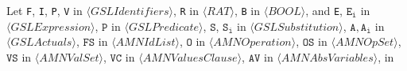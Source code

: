 \documentclass[a4paper,openany]{book}
\begin{document}
\begin{PiDen}
Let \texttt{F}, \texttt{I}, \texttt{P}, \texttt{V} in $\langle\mathit{GSLIdentifiers}\rangle$, \texttt{R} in $\langle\mathit{RAT}\rangle$, \texttt{B} in $\langle\mathit{BOOL}\rangle$, and \texttt{E}, $\mathtt{E_{i}}$ in $\langle\mathit{GSLExpression}\rangle$, $\mathtt{P}$ in $\langle\mathit{GSLPredicate}\rangle$, $\mathtt{S}$, $\mathtt{S_i}$ in $\langle\mathit{GSLSubstitution}\rangle$,  $\mathtt{A}, \mathtt{A_i}$ in $\langle\mathit{GSLActuals}\rangle$, $\mathtt{FS}$ in $\langle\mathit{AMNIdList}\rangle$, $\mathtt{O}$ in $\langle\mathit{AMNOperation}\rangle$, $\mathtt{OS}$ in $\langle\mathit{AMNOpSet}\rangle$, $\mathtt{VS}$ in $\langle\mathit{AMNValSet}\rangle$, $\mathtt{VC}$ in $\langle\mathit{AMNValuesClause}\rangle$, $\mathtt{AV}$ in $\langle\mathit{AMNAbsVariables}\rangle$, in


\end{PiDen}
\end{document}
